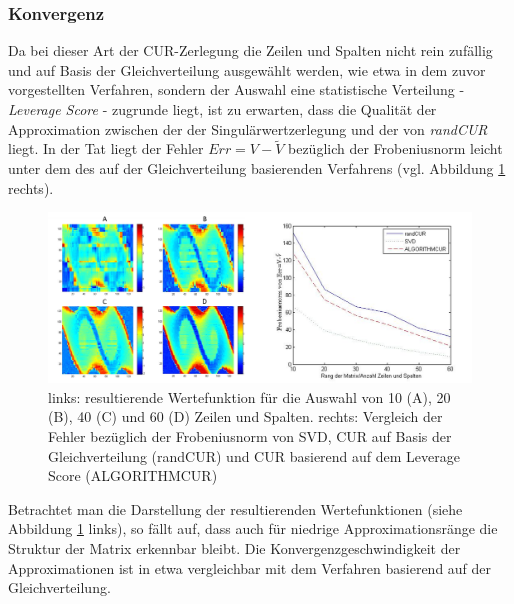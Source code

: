 \documentclass[12pt,a4paper,twoside]{article}
\begin{document}
	\subsubsection*{Konvergenz}
	Da bei dieser Art der CUR-Zerlegung die Zeilen und Spalten nicht rein zufällig und auf Basis der Gleichverteilung ausgewählt werden, wie etwa in dem zuvor vorgestellten Verfahren, sondern der Auswahl eine statistische Verteilung - \textit{Leverage Score} - zugrunde liegt, ist zu erwarten, dass die Qualität der Approximation zwischen der der Singulärwertzerlegung und der von \textit{randCUR} liegt. In der Tat liegt der Fehler $Err=V-\tilde{V}$ bezüglich der Frobeniusnorm leicht unter dem des auf der Gleichverteilung basierenden Verfahrens (vgl. Abbildung \ref{CURortho_vf} rechts).
	\begin{figure}[h]
		\center
		\includegraphics[scale=0.5]{CUR_plots_vf}
		\caption{\label{CURortho_vf}links: resultierende Wertefunktion für die Auswahl von 10 (A), 20 (B), 40 (C) und 60 (D) Zeilen und Spalten. rechts: Vergleich der Fehler bezüglich der Frobeniusnorm von SVD, CUR auf Basis der Gleichverteilung (randCUR) und CUR basierend auf dem Leverage Score (ALGORITHMCUR)}
	\end{figure}
	Betrachtet man die Darstellung der resultierenden Wertefunktionen (siehe Abbildung \ref{CURortho_vf} links), so fällt auf, dass auch für niedrige Approximationsränge die Struktur der Matrix erkennbar bleibt. Die Konvergenzgeschwindigkeit der Approximationen ist in etwa vergleichbar mit dem Verfahren basierend auf der Gleichverteilung.
	\newpage
\end{document}
